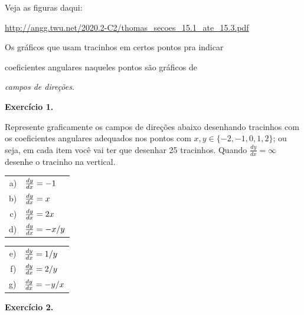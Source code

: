 \documentclass[oneside,12pt]{article}
\begin{document}
\newpage

Veja as figuras daqui:

\ssk

{
\footnotesize

\url{http://angg.twu.net/2020.2-C2/thomas_secoes_15.1_ate_15.3.pdf}

}

\ssk

Os gráficos que usam tracinhos em certos pontos pra indicar

coeficientes angulares naqueles pontos são gráficos de

{\sl campos de direções}.

\msk



{\bf Exercício 1.}

Represente graficamente os campos de direções abaixo desenhando
tracinhos com os coeficientes angulares adequados nos pontos com
$x,y∈\{-2,-1,0,1,2\}$; ou seja, em cada item você vai ter que desenhar
25 tracinhos. Quando $\frac{dy}{dx} = ∞$ desenhe o tracinho na
vertical.

\msk

\begin{tabular}[t]{rl}
a) & $\frac{dy}{dx} = -1$ \\
b) & $\frac{dy}{dx} = x$ \\
c) & $\frac{dy}{dx} = 2x$ \\
d) & $\frac{dy}{dx} = -x/y$ \\
\end{tabular}
\qquad
\begin{tabular}[t]{rl}
e) & $\frac{dy}{dx} = 1/y$ \\
f) & $\frac{dy}{dx} = 2/y$ \\
g) & $\frac{dy}{dx} = -y/x$ \\
\end{tabular}

\newpage


{\bf Exercício 2.}
\end{document}
